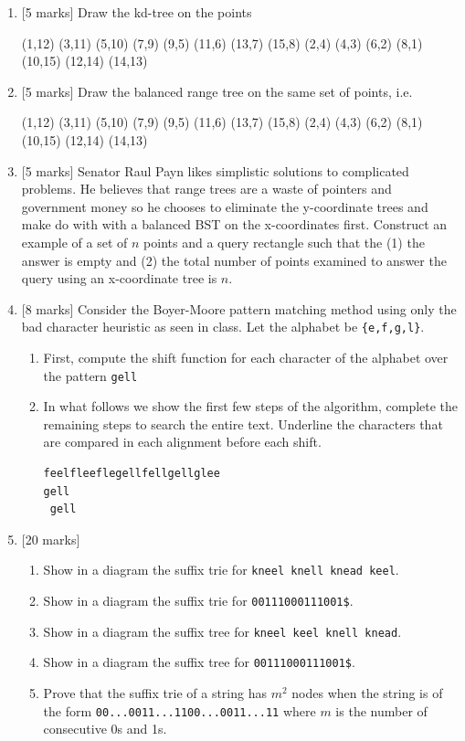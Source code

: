 \documentclass[11pt]{article}
\begin{document}
\begin{enumerate}
\item {[5 marks]} Draw the kd-tree on the points

(1,12) (3,11) (5,10) (7,9) (9,5) (11,6) (13,7) (15,8) 
(2,4) (4,3) (6,2) (8,1) (10,15) (12,14) (14,13) 

\item {[5 marks]} Draw the balanced range tree on the same set of points, i.e.

(1,12) (3,11) (5,10) (7,9) (9,5) (11,6) (13,7) (15,8)
(2,4) (4,3) (6,2) (8,1) (10,15) (12,14) (14,13)


\item {[5 marks]} Senator Raul Payn likes simplistic solutions to complicated problems. He believes
that range trees are a waste of pointers and government money so he chooses to eliminate
the y-coordinate trees and make do with with a balanced BST on the x-coordinates first.
Construct an example of a set of $n$ points and a query rectangle such that the 
(1) the answer is empty and (2) the total number of points examined to answer the
query using an x-coordinate tree is $n$.


\item	{[8 marks]} Consider the Boyer-Moore pattern matching method using only the bad character heuristic as seen in class. Let the alphabet be \verb+{e,f,g,l}+.
    
\begin{enumerate}
\item 	First, compute the shift function for each character of the alphabet over the pattern {\tt gell}
\item	In what follows we show the first few steps of the algorithm, complete the remaining steps to search the entire text. Underline the characters that are compared in each alignment before each shift.

\begin{verbatim}
feelfleeflegellfellgellglee
gell
 gell
\end{verbatim}
\end{enumerate}

\item {[20 marks]}

\begin{enumerate}
\item
	 Show in a diagram the suffix trie for \verb+kneel knell knead keel+.
\item
	 Show in a diagram the suffix trie for \verb+00111000111001$+.
\item
	 Show in a diagram the suffix tree for \verb+kneel keel knell knead+.
\item
	 Show in a diagram the suffix tree for  \verb+00111000111001$+.
\item
 Prove that the suffix trie of a string has $m^2$ nodes when the string is of the form \verb+00...0011...1100...0011...11+ where $m$ is the number of consecutive 0s and 1s.
\end{enumerate}


\end{enumerate}
\end{document}
